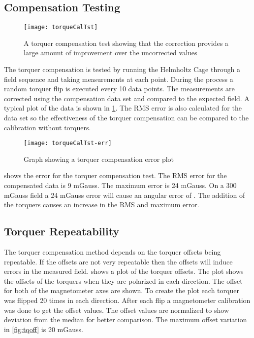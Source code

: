 \subsection{Compensation Testing}

\begin{figure}[!ht]
    \centering
    \texttt{[image: torqueCalTst]}
  \caption{A torquer compensation test showing that the correction provides a large amount of improvement over the uncorrected values}
    \label{fig:tqtst}
\end{figure}

The torquer compensation is tested by running the Helmholtz Cage through a field sequence and taking measurements at each point. During the process a random torquer flip is executed every 10 data points. The measurements are corrected using the compensation data set and compared to the expected field. A typical plot of the data is shown in \cref{fig:tqtst}. The RMS error is also calculated for the data set so the effectiveness of the torquer compensation can be compared to the calibration without torquers.

\begin{figure}[!ht]
    \centering
    \texttt{[image: torqueCalTst-err]}
    \caption{Graph showing a torquer compensation error plot}
    \label{fig:tqerr}
\end{figure}

 shows the error for the torquer compensation test. The RMS error for the compensated data is 9 mGauss. The maximum error is 24 mGauss. On a 300 mGauss field a 24 mGauss error will cause an angular error of \textdegree. The addition of the torquers causes an increase in the RMS and maximum error.

\subsection{Torquer Repeatability}

The torquer compensation method depends on the torquer offsets being repeatable. If the offsets are not very repeatable then the offsets will induce errors in the measured field.  shows a plot of the torquer offsets. The plot shows the offsets of the torquers when they are polarized in each direction. The offset for both of the magnetometer axes are shown. To create the plot each torquer was flipped 20 times in each direction. After each flip a magnetometer calibration was done to get the offset values. The offset values are normalized to show deviation from the median for better comparison. The maximum offset variation in \cref{fig:tqoff} is 20 mGauss.

